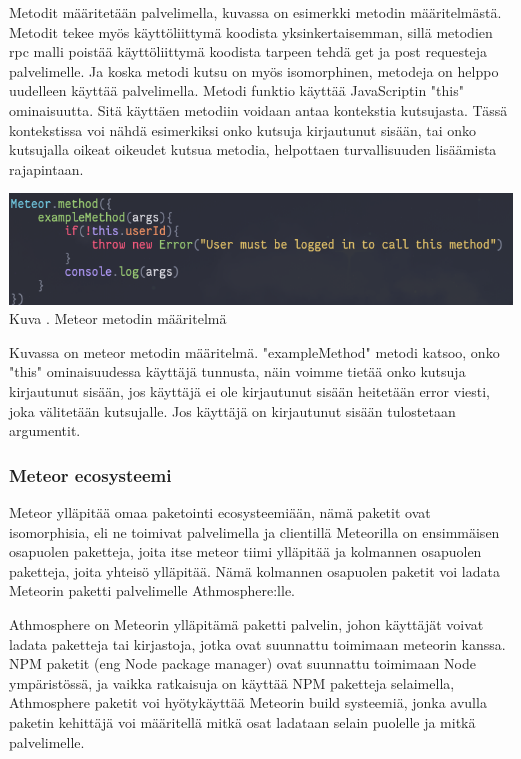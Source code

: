 Metodit määritetään palvelimella, kuvassa \nextImageCount{} on esimerkki metodin määritelmästä.
%
%
Metodit tekee myös käyttöliittymä koodista yksinkertaisemman, 
sillä metodien rpc malli poistää käyttöliittymä koodista tarpeen tehdä get ja post requesteja palvelimelle. 
%
%
Ja koska metodi kutsu on myös isomorphinen, metodeja on helppo uudelleen käyttää palvelimella.
Metodi funktio käyttää JavaScriptin "this"{} ominaisuutta. 
Sitä käyttäen metodiin voidaan antaa kontekstia kutsujasta.
Tässä kontekstissa voi nähdä esimerkiksi onko kutsuja kirjautunut sisään, tai onko kutsujalla oikeat oikeudet kutsua metodia, 
helpottaen turvallisuuden lisäämista rajapintaan.
\bigskip

\includegraphics[width=15cm]{src/public/methodexample.png}\\
Kuva \getImgCount {}. Meteor metodin määritelmä
\medskip

Kuvassa on meteor metodin määritelmä. "exampleMethod"{} metodi katsoo, onko "this"{} ominaisuudessa käyttäjä tunnusta, näin voimme tietää onko kutsuja kirjautunut sisään,
jos käyttäjä ei ole kirjautunut sisään heitetään error viesti, joka välitetään kutsujalle.
Jos käyttäjä on kirjautunut sisään tulostetaan argumentit. 
\medskip




\subsubsection{Meteor ecosysteemi}


%


Meteor ylläpitää omaa paketointi ecosysteemiään, nämä
paketit ovat isomorphisia, eli ne toimivat palvelimella ja clientillä 
Meteorilla on ensimmäisen osapuolen paketteja, joita itse meteor tiimi ylläpitää ja kolmannen osapuolen paketteja,
joita yhteisö ylläpitää. Nämä kolmannen osapuolen paketit voi ladata Meteorin paketti palvelimelle Athmosphere:lle. 
\medskip


Athmosphere on Meteorin ylläpitämä paketti palvelin, johon käyttäjät voivat ladata paketteja tai kirjastoja, jotka ovat suunnattu toimimaan meteorin kanssa.
NPM paketit (eng Node package manager) ovat suunnattu toimimaan Node ympäristössä, ja vaikka ratkaisuja on käyttää NPM paketteja selaimella, 
Athmosphere paketit voi hyötykäyttää Meteorin build systeemiä, jonka avulla paketin kehittäjä voi määritellä mitkä osat ladataan selain puolelle ja mitkä palvelimelle.

